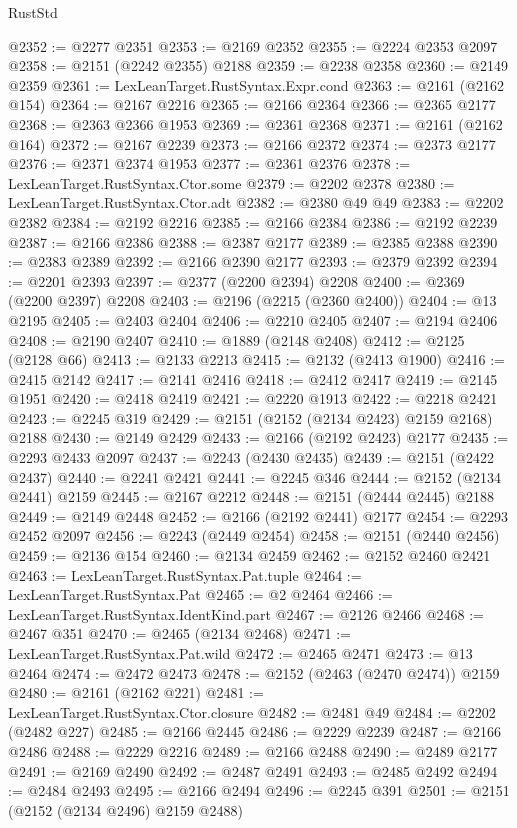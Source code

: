 \begin{lexlean}{RustStd}
\begin{coremodule}
@2352 := @2277 @2351
@2353 := @2169 @2352
@2355 := @2224 @2353 @2097
@2358 := @2151 (@2242 @2355) @2188
@2359 := @2238 @2358
@2360 := @2149 @2359
@2361 := LexLeanTarget.RustSyntax.Expr.cond
@2363 := @2161 (@2162 @154)
@2364 := @2167 @2216
@2365 := @2166 @2364
@2366 := @2365 @2177
@2368 := @2363 @2366 @1953
@2369 := @2361 @2368
@2371 := @2161 (@2162 @164)
@2372 := @2167 @2239
@2373 := @2166 @2372
@2374 := @2373 @2177
@2376 := @2371 @2374 @1953
@2377 := @2361 @2376
@2378 := LexLeanTarget.RustSyntax.Ctor.some
@2379 := @2202 @2378
@2380 := LexLeanTarget.RustSyntax.Ctor.adt
@2382 := @2380 @49 @49
@2383 := @2202 @2382
@2384 := @2192 @2216
@2385 := @2166 @2384
@2386 := @2192 @2239
@2387 := @2166 @2386
@2388 := @2387 @2177
@2389 := @2385 @2388
@2390 := @2383 @2389
@2392 := @2166 @2390 @2177
@2393 := @2379 @2392
@2394 := @2201 @2393
@2397 := @2377 (@2200 @2394) @2208
@2400 := @2369 (@2200 @2397) @2208
@2403 := @2196 (@2215 (@2360 @2400))
@2404 := @13 @2195
@2405 := @2403 @2404
@2406 := @2210 @2405
@2407 := @2194 @2406
@2408 := @2190 @2407
@2410 := @1889 (@2148 @2408)
@2412 := @2125 (@2128 @66)
@2413 := @2133 @2213
@2415 := @2132 (@2413 @1900)
@2416 := @2415 @2142
@2417 := @2141 @2416
@2418 := @2412 @2417
@2419 := @2145 @1951
@2420 := @2418 @2419
@2421 := @2220 @1913
@2422 := @2218 @2421
@2423 := @2245 @319
@2429 := @2151 (@2152 (@2134 @2423) @2159 @2168) @2188
@2430 := @2149 @2429
@2433 := @2166 (@2192 @2423) @2177
@2435 := @2293 @2433 @2097
@2437 := @2243 (@2430 @2435)
@2439 := @2151 (@2422 @2437)
@2440 := @2241 @2421
@2441 := @2245 @346
@2444 := @2152 (@2134 @2441) @2159
@2445 := @2167 @2212
@2448 := @2151 (@2444 @2445) @2188
@2449 := @2149 @2448
@2452 := @2166 (@2192 @2441) @2177
@2454 := @2293 @2452 @2097
@2456 := @2243 (@2449 @2454)
@2458 := @2151 (@2440 @2456)
@2459 := @2136 @154
@2460 := @2134 @2459
@2462 := @2152 @2460 @2421
@2463 := LexLeanTarget.RustSyntax.Pat.tuple
@2464 := LexLeanTarget.RustSyntax.Pat
@2465 := @2 @2464
@2466 := LexLeanTarget.RustSyntax.IdentKind.part
@2467 := @2126 @2466
@2468 := @2467 @351
@2470 := @2465 (@2134 @2468)
@2471 := LexLeanTarget.RustSyntax.Pat.wild
@2472 := @2465 @2471
@2473 := @13 @2464
@2474 := @2472 @2473
@2478 := @2152 (@2463 (@2470 @2474)) @2159
@2480 := @2161 (@2162 @221)
@2481 := LexLeanTarget.RustSyntax.Ctor.closure
@2482 := @2481 @49
@2484 := @2202 (@2482 @227)
@2485 := @2166 @2445
@2486 := @2229 @2239
@2487 := @2166 @2486
@2488 := @2229 @2216
@2489 := @2166 @2488
@2490 := @2489 @2177
@2491 := @2169 @2490
@2492 := @2487 @2491
@2493 := @2485 @2492
@2494 := @2484 @2493
@2495 := @2166 @2494
@2496 := @2245 @391
@2501 := @2151 (@2152 (@2134 @2496) @2159 @2488)

\end{coremodule}
\end{lexlean}
